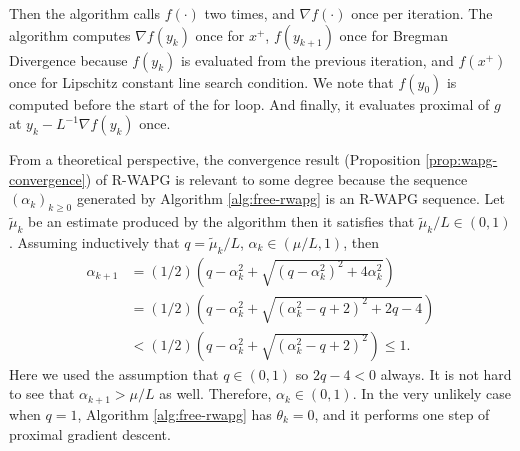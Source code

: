 \documentclass[12pt]{article}
\begin{document}
    Then the algorithm calls $f(\cdot)$ two times, and $\nabla f(\cdot)$ once per iteration. 
    The algorithm computes $\nabla f(y_k)$ once for $x^+$, $f(y_{k + 1})$ once for Bregman Divergence because $f(y_{k})$ is evaluated from the previous iteration, and $f(x^+)$ once for Lipschitz constant line search condition. 
    We note that $f(y_0)$ is computed before the start of the for loop. 
    And finally, it evaluates proximal of $g$ at $y_k - L^{-1}\nabla f(y_k)$ once. 
    \par 
    From a theoretical perspective, the convergence result (Proposition \ref{prop:wapg-convergence}) of R-WAPG is relevant to some degree because the sequence $(\alpha_k)_{k \ge 0}$ generated by Algorithm \ref{alg:free-rwapg} is an R-WAPG sequence. 
    Let $\tilde \mu_k$ be an estimate produced by the algorithm then it satisfies that $\tilde \mu_k/ L \in (0, 1)$.
    Assuming inductively that $q = \tilde \mu_k/L$,  $\alpha_k \in (\mu/L, 1)$, then 
    \begin{align*}
        \alpha_{k + 1} 
        &= 
        (1/2)\left(
            q - \alpha_k^2 + \sqrt{(q - \alpha_k^2)^2 + 4 \alpha_k^2}
        \right)
        \\
        &= 
        (1/2)\left(
            q - \alpha_k^2 + \sqrt{
                (\alpha_k^2 - q + 2)^2 + 2q - 4
            }
        \right)
        \\
        &< 
        (1/2)\left(
            q - \alpha_k^2 + \sqrt{
                (\alpha_k^2 - q + 2)^2
            }
        \right) \le 1. 
    \end{align*}
    Here we used the assumption that $q \in (0, 1)$ so $2q - 4 < 0$ always. 
    It is not hard to see that $\alpha_{k + 1} > \mu/L$ as well. 
    Therefore, $\alpha_k \in (0, 1)$. 
    In the very unlikely case when $q = 1$, Algorithm \ref{alg:free-rwapg} has $\theta_k = 0$, and it performs one step of proximal gradient descent. 
\end{document}
